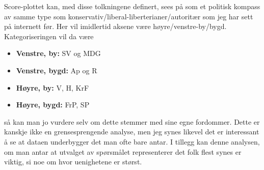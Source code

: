 Score-plottet kan, med disse tolkningene definert, sees på som et politisk kompass av samme type som konservativ/liberal-liberterianer/autoritær som jeg har sett på internett før. Her vil imidlertid aksene være høyre/venstre-by/bygd. Kategoriseringen vil da være

\begin{itemize}
	\item \textbf{Venstre, by:} SV og MDG
	\item \textbf{Venstre, bygd:} Ap og R
	\item \textbf{Høyre, by:} V, H, KrF
	\item \textbf{Høyre, bygd:} FrP, SP
\end{itemize}
så kan man jo vurdere selv om dette stemmer med sine egne fordommer. Dette er kanskje ikke en grensesprengende analyse, men jeg synes likevel det er interessant å se at dataen underbygger det man ofte bare antar. I tillegg kan denne analysen, om man antar at utvalget av spørsmålet representerer det folk flest synes er viktig, si noe om hvor uenighetene er størst.

